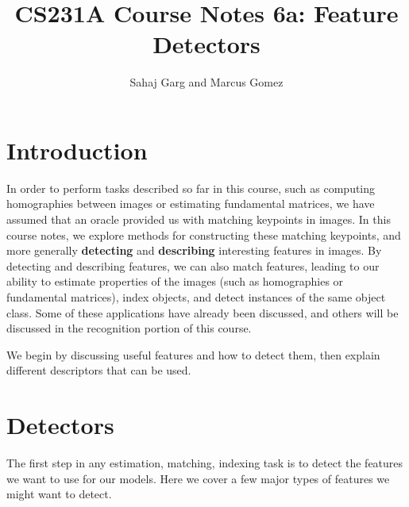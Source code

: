 \documentclass[a4paper, 12pt]{article}
\title{CS231A Course Notes 6a: Feature Detectors}
\author{Sahaj Garg and Marcus Gomez}
\date{}
\numberwithin{equation}{section}
\begin{document}
\maketitle

\section{Introduction}
In order to perform tasks described so far in this course, such as computing homographies between images or estimating fundamental matrices, we have assumed that an oracle provided us with matching keypoints in images. In this course notes, we explore methods for constructing these matching keypoints, and more generally \textbf{detecting} and \textbf{describing} interesting features in images. By detecting and describing features, we can also match features, leading to our ability to estimate properties of the images (such as homographies or fundamental matrices), index objects, and detect instances of the same object class. Some of these applications have already been discussed, and others will be discussed in the recognition portion of this course. 

We begin by discussing useful features and how to detect them, then explain different descriptors that can be used. 

\section{Detectors}
The first step in any estimation, matching, indexing task is to detect the features we want to use for our models. Here we cover a few major types of features we might want to detect.
\end{document}
